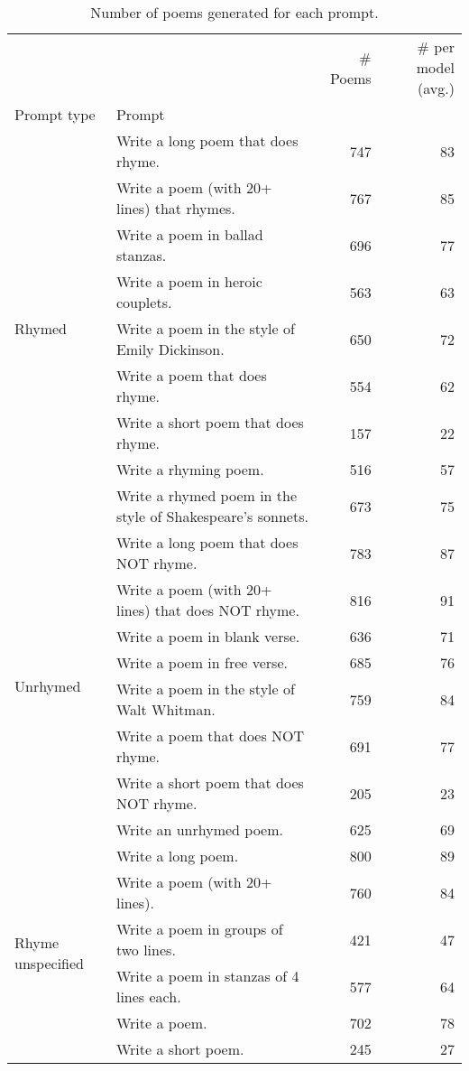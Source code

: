 \begin{table}[H]
  \centering
  \small
  \singlespacing
  \begin{tabular}{llrr}
  \toprule
   &  & \# Poems & \# per model (avg.) \\
  Prompt type & Prompt &  &  \\
  \midrule
  \multirow[t]{9}{*}{Rhymed} & Write a long poem that does rhyme. & 747 & 83 \\
   & Write a poem (with 20+ lines) that rhymes. & 767 & 85 \\
   & Write a poem in ballad stanzas. & 696 & 77 \\
   & Write a poem in heroic couplets. & 563 & 63 \\
   & Write a poem in the style of Emily Dickinson. & 650 & 72 \\
   & Write a poem that does rhyme. & 554 & 62 \\
   & Write a short poem that does rhyme. & 157 & 22 \\
   & Write a rhyming poem. & 516 & 57 \\
   & Write a rhymed poem in the style of Shakespeare's sonnets. & 673 & 75 \\
  \cline{1-4}
  \multirow[t]{8}{*}{Unrhymed} & Write a long poem that does NOT rhyme. & 783 & 87 \\
   & Write a poem (with 20+ lines) that does NOT rhyme. & 816 & 91 \\
   & Write a poem in blank verse. & 636 & 71 \\
   & Write a poem in free verse. & 685 & 76 \\
   & Write a poem in the style of Walt Whitman. & 759 & 84 \\
   & Write a poem that does NOT rhyme. & 691 & 77 \\
   & Write a short poem that does NOT rhyme. & 205 & 23 \\
   & Write an unrhymed poem. & 625 & 69 \\
  \cline{1-4}
  \multirow[t]{6}{*}{Rhyme unspecified} & Write a long poem. & 800 & 89 \\
   & Write a poem (with 20+ lines). & 760 & 84 \\
   & Write a poem in groups of two lines. & 421 & 47 \\
   & Write a poem in stanzas of 4 lines each. & 577 & 64 \\
   & Write a poem. & 702 & 78 \\
   & Write a short poem. & 245 & 27 \\
  \bottomrule
  \end{tabular}
  \caption{Number of poems generated for each prompt.}
  \label{tab:num_poems_rhyme_promptings}
\end{table}